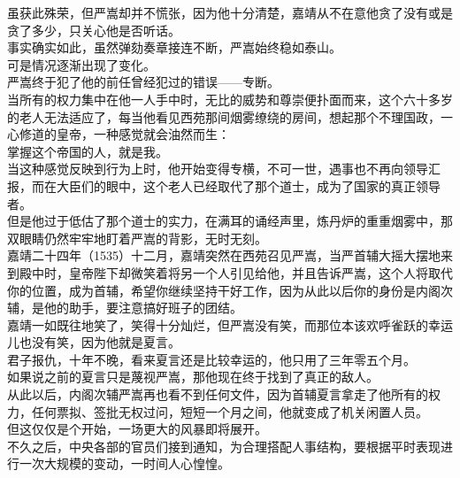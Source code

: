 \begin{multicols}{\theparacolNo}
虽获此殊荣，但严嵩却并不慌张，因为他十分清楚，嘉靖从不在意他贪了没有或是贪了多少，只关心他是否听话。\\

事实确实如此，虽然弹劾奏章接连不断，严嵩始终稳如泰山。\\

可是情况逐渐出现了变化。\\

严嵩终于犯了他的前任曾经犯过的错误——专断。\\

当所有的权力集中在他一人手中时，无比的威势和尊崇便扑面而来，这个六十多岁的老人无法适应了，每当他看见西苑那间烟雾缭绕的房间，想起那个不理国政，一心修道的皇帝，一种感觉就会油然而生：\\

掌握这个帝国的人，就是我。\\

当这种感觉反映到行为上时，他开始变得专横，不可一世，遇事也不再向领导汇报，而在大臣们的眼中，这个老人已经取代了那个道士，成为了国家的真正领导者。\\

但是他过于低估了那个道士的实力，在满耳的诵经声里，炼丹炉的重重烟雾中，那双眼睛仍然牢牢地盯着严嵩的背影，无时无刻。\\

嘉靖二十四年（1535）十二月，嘉靖突然在西苑召见严嵩，当严首辅大摇大摆地来到殿中时，皇帝陛下却微笑着将另一个人引见给他，并且告诉严嵩，这个人将取代你的位置，成为首辅，希望你继续坚持干好工作，因为从此以后你的身份是内阁次辅，是他的助手，要注意搞好班子的团结。\\

嘉靖一如既往地笑了，笑得十分灿烂，但严嵩没有笑，而那位本该欢呼雀跃的幸运儿也没有笑，因为他就是夏言。\\

君子报仇，十年不晚，看来夏言还是比较幸运的，他只用了三年零五个月。\\

如果说之前的夏言只是蔑视严嵩，那他现在终于找到了真正的敌人。\\

从此以后，内阁次辅严嵩再也看不到任何文件，因为首辅夏言拿走了他所有的权力，任何票拟、签批无权过问，短短一个月之间，他就变成了机关闲置人员。\\

但这仅仅是个开始，一场更大的风暴即将展开。\\

不久之后，中央各部的官员们接到通知，为合理搭配人事结构，要根据平时表现进行一次大规模的变动，一时间人心惶惶。\\


\end{multicols}

